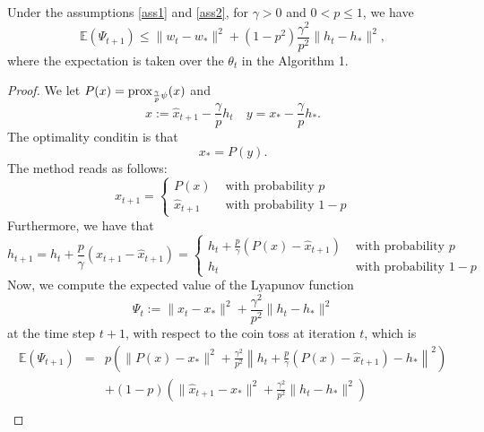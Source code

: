 \begin{itemize}
\begin{lemma}\label{3.3}
Under the assumptions \ref{ass1} and \ref{ass2}, for $\gamma > 0$ and $0 < p \leq 1$, we have 
\begin{equation} 
\mathbb{E}(\Psi_{t+1}) \leq \|w_t - w_*\|^2 + (1 - p^2) \frac{\gamma^2}{p^2} \|h_t - h_*\|^2, 
\end{equation} 
where the expectation is taken over the $\theta_t$ in the Algorithm 1. 
\end{lemma} 
\begin{proof} 
We let $P(x) = {\rm prox}_{\frac{\gamma}{p}\psi}(x)$ and 
\begin{equation}
x := \widehat{x}_{t+1} - \frac{\gamma}{p} h_t \quad y = x_* - \frac{\gamma}{p} h_*. 
\end{equation}
The optimality conditin is that 
\begin{equation} 
x_* = P(y). 
\end{equation} 
The method reads as follows: 
\begin{equation}
x_{t+1} = \left \{ \begin{array}{ll} P(x) & \mbox{ with probability } p \\ \widehat{x}_{t+1} & \mbox{ with probability } 1 - p \end{array}  \right. 
\end{equation}
Furthermore, we have that 
\begin{equation}
h_{t+1} = h_t + \frac{p}{\gamma} (x_{t+1} - \widehat{x}_{t+1}) = \left \{ \begin{array}{ll} h_t + \frac{p}{\gamma} \left ( P(x) - \widehat{x}_{t+1} \right ) & \mbox{ with probability } p \\ h_t & \mbox{ with probability } 1 - p \end{array}  \right. 
\end{equation}
Now, we compute the expected value of the Lyapunov function 
\begin{equation}
\Psi_t := \|x_t - x_*\|^2 + \frac{\gamma^2}{p^2} \|h_t - h_*\|^2 
\end{equation}
at the time step $t+1$, with respect to the coin toss at iteration $t$, which is 
\begin{eqnarray}
\mathbb{E}(\Psi_{t+1}) &=& p \left ( \|P(x) - x_*\|^2 + \frac{\gamma^2}{p^2} \left \|h_t + \frac{p}{\gamma} (P(x) - \widehat{x}_{t+1})  - h_* \right \|^2 \right ) \\
&& + (1-p) \left ( \|\widehat{x}_{t+1} - x_*\|^2 + \frac{\gamma^2}{p^2} \|h_t - h_*\|^2  \right ) \\

\end{eqnarray}
\end{proof}
\end{itemize}
